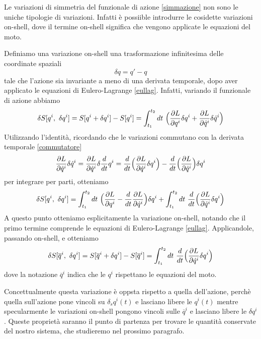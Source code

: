     \hfill

    Le variazioni di simmetria del funzionale di azione \eqref{simmazione} non sono le uniche tipologie di variazioni. Infatti è possiible introdurre le cosidette variazioni on-shell, dove il termine on-shell significa che vengono applicate le equazioni del moto. 
\begin{definition}
    Definiamo una variazione on-shell una trasformazione infinitesima delle coordinate spaziali 
\begin{equation}\label{simmonshell}
    \delta q = q' - q
\end{equation} 
    tale che l'azione sia invariante a meno di una derivata temporale, dopo aver applicato le equazioni di Eulero-Lagrange \eqref{eullag}. Infatti, variando il funzionale di azione abbiamo
\begin{equation}
    \delta S[q^i,~\delta q^i] = S[q^i + \delta q^i] - S[q^i] = \int_{t_1}^{t_2}dt~ \Big( \frac{\partial L}{\partial q^i} \delta q^i + \frac{\partial L}{\partial\dot q^i} \delta \dot q^i \Big)
\end{equation}
    Utilizzando l'identità, ricordando che le variazioni commutano con la derivata temporale \eqref{commutatore}
\begin{equation*}
    \frac{\partial L}{\partial\dot q^i} \delta \dot q^i = \frac{\partial L}{\partial\dot q^i} \delta \frac{d}{dt} q^i = \frac{d}{dt} \Big (\frac{\partial L}{\partial\dot q^i} \delta q^i \Big) - \frac{d}{dt} \Big ( \frac{\partial L}{\partial\dot q^i} \Big) \delta q^i 
\end{equation*}
    per integrare per parti, otteniamo
\begin{equation*}
    \delta S[q^i,~\delta q^i] = \int_{t_1}^{t_2}dt~ \Big( \frac{\partial L}{\partial q^i}  - \frac{d}{dt} \frac{\partial L}{\partial\dot q^i} \Big ) \delta q^i + \int_{t_1}^{t_2}dt~ \frac{d}{dt} \Big( \frac{\partial L}{\partial\dot q^i} \delta q^i \Big )
\end{equation*}
    A questo punto otteniamo esplicitamente la variazione on-shell, notando che il primo termine comprende le equazioni di Eulero-Lagrange \eqref{eullag}. Applicandole, passando on-shell, e otteniamo 
\begin{equation} \label{invonshell}
    \delta S[\overline q^i,~\delta q^i] = S[\overline q^i + \delta q^i] - S[\overline q^i] = \int_{t_1}^{t_2}dt~ \frac{d}{dt} \Big( \frac{\partial L}{\partial\dot q^i} \delta q^i \Big )
\end{equation}
    dove la notazione $\overline q^i$ indica che le $q^i$ rispettano le equazioni del moto.
\end{definition}  

    Concettualmente questa variazione è oppsta rispetto a quella dell'azione, perchè quella sull'azione pone vincoli su $\delta_s q^i(t)$ e lasciano libere le $q^i(t)$ mentre specularmente le variazioni on-shell pongono vincoli sulle $\overline q^i$ e lasciano libere le $\delta q^i$. Queste proprietà saranno il punto di partenza per trovare le quantità conservate del nostro sistema, che studieremo nel prossimo paragrafo. 

